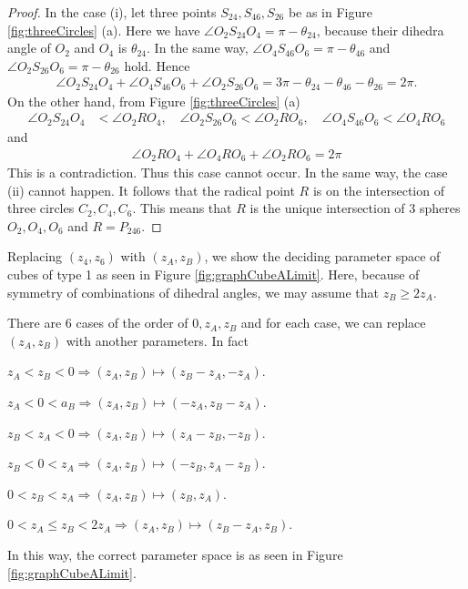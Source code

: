 \documentclass[suppldata, dvipdfmx]{interact}
\theoremstyle{plain}%
\theoremstyle{definition}
\theoremstyle{remark}
\theoremstyle{problemstyle}
\begin{document}
\begin{proof}
In the case (i), let three points $S_{24}, S_{46}, S_{26}$ be as in Figure
\ref{fig:threeCircles} (a). Here we have
$\angle O_2 S_{24} O_4 = \pi - \theta_{24}$,
because their dihedra angle of $O_2$ and $O_4$ is $\theta_{24}$.
In the same way, $\angle O_4 S_{46}O_6 = \pi - \theta_{46}$ and
$\angle O_2S_{26}O_6 = \pi-\theta_{26}$ hold. Hence
\begin{align*}
 \angle O_2 S_{24} O_4 + \angle O_4 S_{46} O_6 + \angle O_2 S_{26} O_6 = 3\pi -
 \theta_{24} - \theta_{46} - \theta_{26} = 2\pi.
\end{align*}
On the other hand, from Figure \ref{fig:threeCircles} (a)
\begin{align*}
 \angle O_2 S_{24} O_4 &< \angle O_2 R O_4,\quad 
 \angle O_2 S_{26} O_6 < \angle O_2 R O_6,\quad
 \angle O_4 S_{46} O_6 < \angle O_4 R O_6
\end{align*}
and
\begin{align*}
 \angle O_2 R O_4 + \angle O_4 R O_6 + \angle O_2 R O_6 = 2\pi
\end{align*}
This is a contradiction. Thus this case cannot occur. In the same way,
 the case (ii) cannot happen. It follows that the radical point $R$
 is on the intersection of three circles $C_2, C_4, C_6$.  This means that
 $R$ is the unique intersection of 3 spheres $O_2, O_4, O_6$ and $R=P_{246}$.
\end{proof} 

Replacing $(z_4, z_6)$ with $(z_A, z_B)$, we show the deciding parameter space of cubes of type 1 as seen in Figure \ref{fig:graphCubeALimit}.  Here, because of symmetry of combinations of dihedral angles, we may assume that $z_B\ge 2z_A$.

There are 6 cases of the order of $0, z_A, z_B$ and for each case, we can replace $(z_A, z_B)$ with another parameters.  In fact\par
 $z_A < z_B < 0 \Rightarrow (z_A, z_B) \mapsto (z_B-z_A, -z_A)$.\par
 $z_A < 0 < a_B \Rightarrow (z_A, z_B) \mapsto (-z_A, z_B-z_A)$.\par
 $z_B < z_A < 0 \Rightarrow (z_A, z_B) \mapsto (z_A-z_B, -z_B)$.\par
 $z_B < 0 < z_A \Rightarrow (z_A, z_B) \mapsto (-z_B, z_A-z_B)$.\par
 $0 < z_B < z_A \Rightarrow (z_A, z_B) \mapsto (z_B, z_A)$.\par
$0 < z_A \leq z_B < 2z_A \Rightarrow (z_A, z_B) \mapsto (z_B-z_A,z_B)$.\par
In this way, the correct parameter space is as seen in Figure \ref{fig:graphCubeALimit}. 
\end{document}
